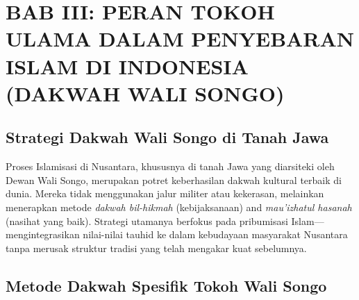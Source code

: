 \documentclass[12pt, a4paper]{article}
\begin{document}
\newpage

\section{BAB III: PERAN TOKOH ULAMA DALAM PENYEBARAN ISLAM DI INDONESIA (DAKWAH WALI SONGO)}

\subsection{Strategi Dakwah Wali Songo di Tanah Jawa}
Proses Islamisasi di Nusantara, khususnya di tanah Jawa yang diarsiteki oleh Dewan Wali Songo, merupakan potret keberhasilan dakwah kultural terbaik di dunia. Mereka tidak menggunakan jalur militer atau kekerasan, melainkan menerapkan metode \textit{dakwah bil-hikmah} (kebijaksanaan) and \textit{mau'izhatul hasanah} (nasihat yang baik). Strategi utamanya berfokus pada pribumisasi Islam—mengintegrasikan nilai-nilai tauhid ke dalam kebudayaan masyarakat Nusantara tanpa merusak struktur tradisi yang telah mengakar kuat sebelumnya.

\subsection{Metode Dakwah Spesifik Tokoh Wali Songo}
\end{document}
